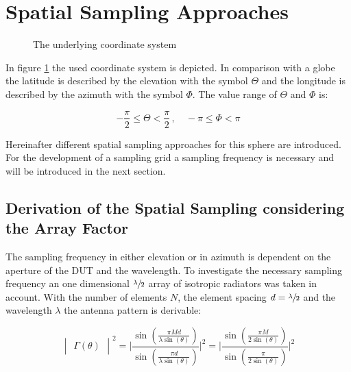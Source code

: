 \section{Spatial Sampling Approaches}

\begin{figure}[H]
\centering
\def\svgwidth{0.4\textwidth}

\caption{The underlying coordinate system}
\label{coordinates}
\end{figure}

In figure \ref{coordinates} the used coordinate system is depicted. In comparison with a globe the latitude is described by the elevation with the symbol $\Theta$ and the longitude is described by the azimuth with the symbol $\Phi$. The value range of $\Theta$ and $\Phi$ is:

\begin{equation}
-\frac{\pi}{2} \leq \Theta <\frac{\pi}{2}\, ,\quad -\pi \leq \Phi < \pi
\end{equation}

Hereinafter different spatial sampling approaches for this sphere are introduced. For the development of a sampling grid a sampling frequency is necessary and will be introduced in the next section.

\subsection{Derivation of the Spatial Sampling considering the Array Factor}

The sampling frequency in either elevation or in azimuth is dependent on the aperture of the \ac{DUT} and the wavelength. To investigate the necessary sampling frequency an one dimensional $\sfrac{\lambda}{2}$ array of isotropic radiators was taken in account. With the number of elements $N$, the element spacing $d = \sfrac{\lambda}{2}$ and the wavelength $\lambda$ the antenna pattern is derivable: \cite{litze}

\begin{equation}
\begin{vmatrix}\Gamma\left(\theta\right)\end{vmatrix}^2 = \Biggl|\frac{\sin\left(\frac{\pi M d}{\lambda \sin\left(\theta\right)}\right)}{\sin\left(\frac{\pi d}{\lambda \sin\left(\theta\right)}\right)}\Biggl|^2 = \Biggl|\frac{\sin\left(\frac{\pi M}{2 \sin\left(\theta\right)}\right)}{\sin\left(\frac{\pi}{2 \sin\left(\theta\right)}\right)}\Biggl|^2
\end{equation}

